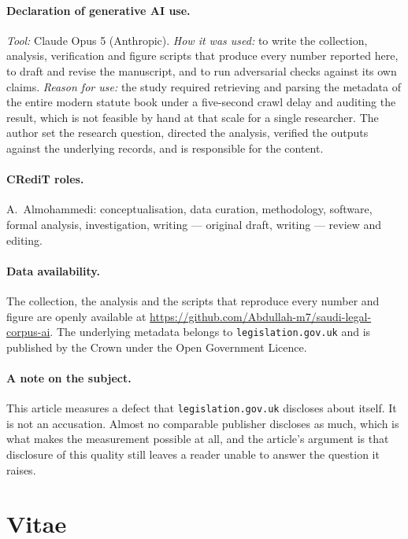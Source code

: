 \documentclass[11pt]{article}
\begin{document}
\paragraph{Declaration of generative AI use.} \emph{Tool:} Claude Opus 5
(Anthropic). \emph{How it was used:} to write the collection, analysis,
verification and figure scripts that produce every number reported here, to
draft and revise the manuscript, and to run adversarial checks against its own
claims. \emph{Reason for use:} the study required retrieving and parsing the
metadata of the entire modern statute book under a five-second crawl delay and
auditing the result, which is not feasible by hand at that scale for a single
researcher. The author set the research question, directed the analysis,
verified the outputs against the underlying records, and is responsible for the
content.


\paragraph{CRediT roles.} A.~Almohammedi: conceptualisation, data curation,
methodology, software, formal analysis, investigation, writing --- original
draft, writing --- review and editing.

\paragraph{Data availability.} The collection, the analysis and the scripts
that reproduce every number and figure are openly available at
\url{https://github.com/Abdullah-m7/saudi-legal-corpus-ai}. The underlying
metadata belongs to \texttt{legislation.gov.uk} and is published by the Crown
under the Open Government Licence.


\paragraph{A note on the subject.} This article measures a defect that
\texttt{legislation.gov.uk} discloses about itself. It is not an accusation.
Almost no comparable publisher discloses as much, which is what makes the
measurement possible at all, and the article's argument is that disclosure of
this quality still leaves a reader unable to answer the question it raises.

\section*{Vitae}
\end{document}
